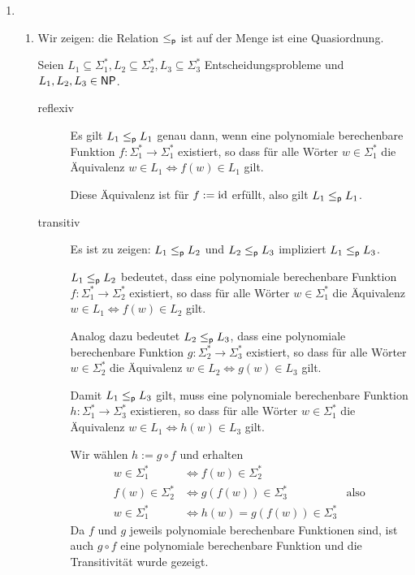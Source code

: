 \begin{enumerate}
  \item \begin{enumerate}
    \item Wir zeigen: die Relation $\leq_{\textsf{p}}$ ist auf der Menge \NP{} ist eine
      Quasiordnung.

      Seien
      $L_1 \subseteq \Sigma_1^*,
        L_2 \subseteq \Sigma_2^*,
        L_3 \subseteq \Sigma_3^*$
      Entscheidungsprobleme und
      $L_1, L_2, L_3 \in \textsf{NP}$.

      \begin{description}
        \item[reflexiv] Es gilt $L_1 \leq_{\textsf{p}} L_1$ genau dann, wenn eine polynomiale
          berechenbare Funktion $f: \Sigma_1^* \rightarrow \Sigma_1^*$
          existiert, so dass für alle Wörter $w \in \Sigma_1^*$ die Äquivalenz
          $w \in L_1 \Leftrightarrow f(w) \in L_1$ gilt.

          Diese Äquivalenz ist für $f := \text{id}$ erfüllt, also gilt $L_1 \leq_{\textsf{p}} L_1$.

        \item[transitiv] Es ist zu zeigen: $L_1 \leq_{\textsf{p}} L_2$ und $L_2 \leq_{\textsf{p}} L_3$
          impliziert $L_1 \leq_{\textsf{p}} L_3$.

          $L_1 \leq_{\textsf{p}} L_2$ bedeutet, dass eine polynomiale berechenbare Funktion
          $f: \Sigma_1^* \rightarrow \Sigma_2^*$ existiert, so dass für alle
          Wörter
          $w \in \Sigma_1^*$ die Äquivalenz
          $w \in L_1 \Leftrightarrow f(w) \in L_2$ gilt.

          Analog dazu bedeutet $L_2 \leq_{\textsf{p}} L_3$, dass eine polynomiale berechenbare
          Funktion
          $g: \Sigma_2^* \rightarrow \Sigma_3^*$
          existiert, so dass für alle Wörter
          $w \in \Sigma_2^*$ die Äquivalenz
          $w \in L_2 \Leftrightarrow g(w) \in L_3$ gilt.

          Damit $L_1 \leq_{\textsf{p}} L_3$ gilt, muss eine polynomiale berechenbare Funktion
          $h: \Sigma_1^* \rightarrow \Sigma_3^*$
          existieren, so dass für alle Wörter
          $w \in \Sigma_1^*$ die Äquivalenz
          $w \in L_1 \Leftrightarrow h(w) \in L_3$ gilt.

          Wir wählen $h := g \circ f$ und erhalten
          \begin{align*}
            w \in \Sigma_1^* & \Leftrightarrow f(w) \in \Sigma_2^*\\
            f(w) \in \Sigma_2^* & \Leftrightarrow g(f(w)) \in \Sigma_3^*
              & \text{also}\\
            w \in \Sigma_1^* & \Leftrightarrow h(w) = g(f(w)) \in \Sigma_3^*
          \end{align*}
          Da $f$ und $g$ jeweils polynomiale berechenbare Funktionen sind, ist
          auch $g \circ f$ eine polynomiale berechenbare Funktion und die
          Transitivität wurde gezeigt.
      \end{description}


\end{enumerate}
\end{enumerate}
